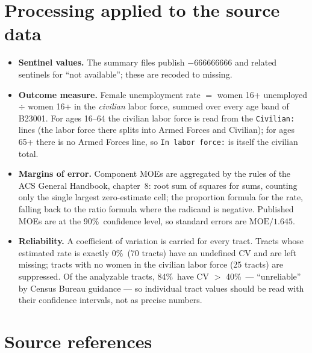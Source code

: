 \documentclass[11pt]{article}
\begin{document}
\section{Processing applied to the source data}

\begin{itemize}
\item \textbf{Sentinel values.} The summary files publish
  $-666666666$ and related sentinels for ``not available''; these are
  recoded to missing.
\item \textbf{Outcome measure.} Female unemployment rate $=$ women 16+
  unemployed $\div$ women 16+ in the \emph{civilian} labor force, summed
  over every age band of B23001. For ages 16--64 the civilian labor force
  is read from the \texttt{Civilian:} lines (the labor force there splits
  into Armed Forces and Civilian); for ages 65+ there is no Armed Forces
  line, so \texttt{In labor force:} is itself the civilian total.
\item \textbf{Margins of error.} Component MOEs are aggregated by the
  rules of the ACS General Handbook, chapter~8: root sum of squares for
  sums, counting only the single largest zero-estimate cell; the
  proportion formula for the rate, falling back to the ratio formula
  where the radicand is negative. Published MOEs are at the 90\%\
  confidence level, so standard errors are $\mathrm{MOE}/1.645$.
\item \textbf{Reliability.} A coefficient of variation is carried for
  every tract. Tracts whose estimated rate is exactly 0\%\ (70 tracts)
  have an undefined CV and are left missing; tracts with no women in the
  civilian labor force (25 tracts) are suppressed. Of the analyzable
  tracts, 84\%\ have CV $>$ 40\%\ --- ``unreliable'' by Census Bureau
  guidance --- so individual tract values should be read with their
  confidence intervals, not as precise numbers.
\end{itemize}

\section{Source references}
\end{document}
